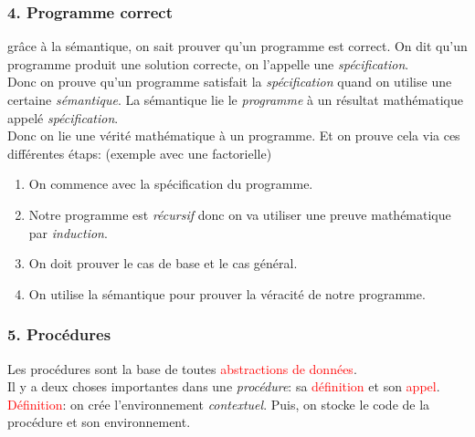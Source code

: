 \documentclass{report}
\begin{document}
\subsubsection{4. Programme correct}
grâce à la sémantique, on sait prouver qu'un programme est correct. On dit qu'un programme produit une solution correcte, on l'appelle une \textit{spécification}.\\
Donc on prouve qu'un programme satisfait la \textit{spécification} quand on utilise une certaine \textit{sémantique}. La sémantique lie le \textit{programme} à un résultat mathématique appelé \textit{spécification}.\\

Donc on lie une vérité mathématique à un programme. Et on prouve cela via ces différentes étaps: (exemple avec une factorielle)

\begin{enumerate}
\item On commence avec la spécification du programme.
\item Notre programme est \textit{récursif} donc on va utiliser une preuve mathématique par \textit{induction}.
\item On doit prouver le cas de base et le cas général.
\item On utilise la sémantique pour prouver la véracité de notre programme.
\end{enumerate}

\subsubsection{5. Procédures}
Les procédures sont la base de toutes \textcolor{red}{abstractions de données}.\\
Il y a deux choses importantes dans une \textit{procédure}: sa \textcolor{red}{définition} et son \textcolor{red}{appel}.\\

\textcolor{red}{Définition}: on crée l'environnement \textit{contextuel}. Puis, on stocke le code de la procédure et son environnement.\\
\end{document}
